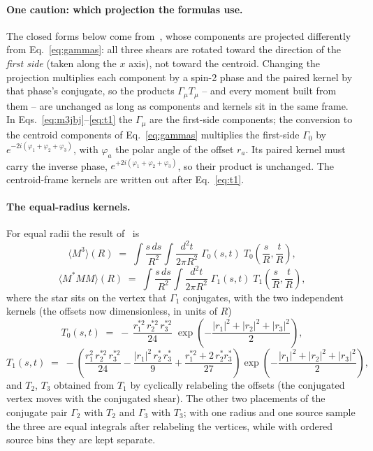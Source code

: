 \documentclass[11pt]{article}
\numberwithin{equation}{section}
\begin{document}
\paragraph{One caution: which projection the formulas use.}
The closed forms below come from~\cite{JBJ}, whose components are
projected differently from Eq.~\eqref{eq:gammas}: all three shears
are rotated toward the direction of the \emph{first side} (taken
along the $x$ axis), not toward the centroid.  Changing the
projection multiplies each component by a spin-2 phase and the
paired kernel by that phase's conjugate, so the products
$\Gamma_\mu T_\mu$ -- and every moment built from them -- are
unchanged as long as components and kernels sit in the same frame.
In Eqs.~\eqref{eq:m3jbj}--\eqref{eq:t1} the $\Gamma_\mu$ are the
first-side components; the conversion to the centroid components of
Eq.~\eqref{eq:gammas} multiplies the first-side $\Gamma_0$ by
$e^{-2i(\varphi_1+\varphi_2+\varphi_3)}$, with $\varphi_a$ the
polar angle of the offset $r_a$. Its paired kernel must carry the inverse
phase, $e^{+2i(\varphi_1+\varphi_2+\varphi_3)}$, so their product is
unchanged. The centroid-frame kernels are written out after
Eq.~\eqref{eq:t1}.

\paragraph{The equal-radius kernels.}
For equal radii the result of~\cite{JBJ} is
\begin{equation}
  \bigl\langle M^3 \bigr\rangle(R)
  \;=\;
  \int \frac{s\, ds}{R^2} \int \frac{d^2 t}{2\pi R^2}\;
  \Gamma_0(s, t)\;
  T_0\!\left(\frac{s}{R}, \frac{t}{R}\right),
  \label{eq:m3jbj}
\end{equation}
\begin{equation}
  \bigl\langle M^{*} M M \bigr\rangle(R)
  \;=\;
  \int \frac{s\, ds}{R^2} \int \frac{d^2 t}{2\pi R^2}\;
  \Gamma_1(s, t)\;
  T_1\!\left(\frac{s}{R}, \frac{t}{R}\right),
  \label{eq:m2mjbj}
\end{equation}
where the star sits on the vertex that $\Gamma_1$ conjugates, with
the two independent kernels (the offsets now dimensionless, in
units of $R$)
\begin{equation}
  T_0(s, t)
  \;=\; -\,\frac{r_1^{*2}\, r_2^{*2}\, r_3^{*2}}{24}\;
  \exp\!\left(-\frac{|r_1|^2 + |r_2|^2 + |r_3|^2}{2}\right),
  \label{eq:t0}
\end{equation}
\begin{equation}
  T_1(s, t)
  \;=\; -\left(
  \frac{r_1^{2}\, r_2^{*2}\, r_3^{*2}}{24}
  - \frac{|r_1|^2\, r_2^{*}\, r_3^{*}}{9}
  + \frac{r_1^{*2} + 2\, r_2^{*} r_3^{*}}{27}
  \right)
  \exp\!\left(-\frac{|r_1|^2 + |r_2|^2 + |r_3|^2}{2}\right),
  \label{eq:t1}
\end{equation}
and $T_2$, $T_3$ obtained from $T_1$ by cyclically relabeling the
offsets (the conjugated vertex moves with the conjugated shear).
The other two placements of the conjugate pair $\Gamma_2$ with
$T_2$ and $\Gamma_3$ with $T_3$; with one radius and one source
sample the three are equal integrals after relabeling the vertices,
while with ordered source bins they are kept separate.
\end{document}
